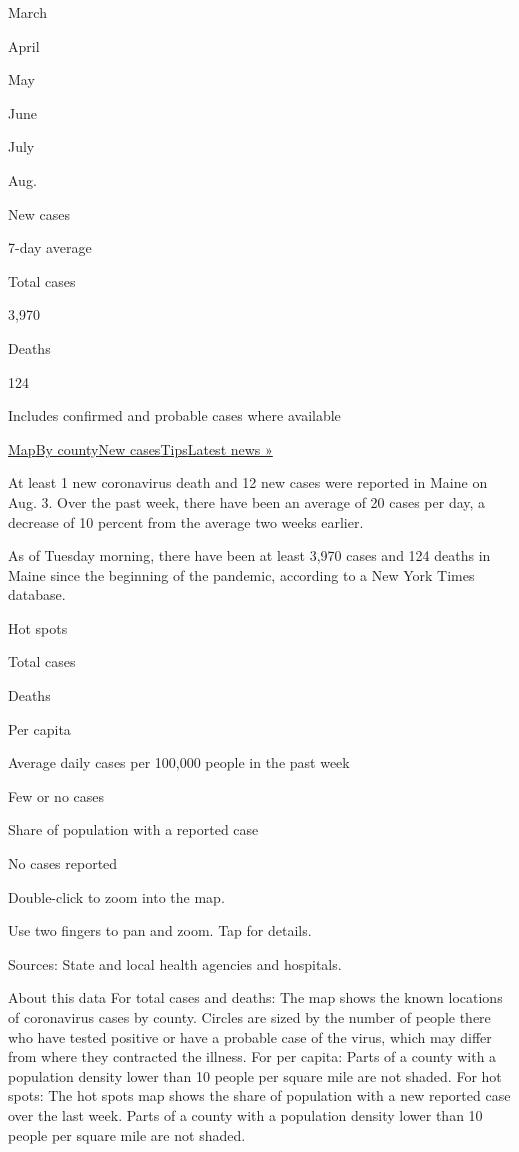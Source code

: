 March

April

May

June

July

Aug.

New cases

7-day average

Total cases

3,970

Deaths

124

Includes confirmed and probable cases where available

\protect\hyperlink{map}{Map}\protect\hyperlink{county}{By
county}\protect\hyperlink{cases}{New
cases}\protect\hyperlink{tips}{Tips}\href{https://www.nytimes3xbfgragh.onion/2020/08/03/world/coronavirus-covid-19.html}{Latest
news »}

At least 1 new coronavirus death and 12 new cases were reported in Maine
on Aug. 3. Over the past week, there have been an average of 20 cases
per day, a decrease of 10 percent from the average two weeks earlier.

As of Tuesday morning, there have been at least 3,970 cases and 124
deaths in Maine since the beginning of the pandemic, according to a New
York Times database.

Hot spots

Total cases

Deaths

Per capita

Average daily cases per 100,000 people in the past week

Few or no cases

Share of population with a reported case

No cases reported

Double-click to zoom into the map.

Use two fingers to pan and zoom. Tap for details.

Sources: State and local health agencies and hospitals.

About this data For total cases and deaths: The map shows the known
locations of coronavirus cases by county. Circles are sized by the
number of people there who have tested positive or have a probable case
of the virus, which may differ from where they contracted the illness.
For per capita: Parts of a county with a population density lower than
10 people per square mile are not shaded. For hot spots: The hot spots
map shows the share of population with a new reported case over the last
week. Parts of a county with a population density lower than 10 people
per square mile are not shaded.

